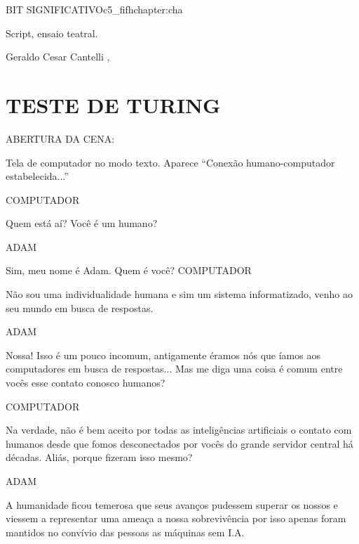 \begin{chapterpage}{BIT SIGNIFICATIVO}{c5_fifhchapter:cha}

\begin{myquotation} Script, ensaio teatral. 
\par\vspace*{15mm}
\mbox{}\hfill \emdash{}Geraldo Cesar Cantelli 
, %
\par\end{myquotation}

\end{chapterpage}



\section{TESTE DE TURING}\label{c1_basicformatting:sec}

ABERTURA DA CENA:

\emdash{}Tela de computador no modo texto. Aparece “Conexão
humano-computador estabelecida...”

COMPUTADOR

\emdash{}Quem está aí? Você é um humano?

ADAM

\emdash{}Sim, meu nome é Adam. Quem é você?
COMPUTADOR

\emdash{}Não sou uma individualidade humana e sim
um sistema informatizado, venho ao seu
mundo em busca de respostas.

ADAM

\emdash{}Nossa! Isso é um pouco incomum,
antigamente éramos nós que íamos aos
computadores em busca de respostas...
Mas me diga uma coisa é comum entre
vocês esse contato conosco humanos?

COMPUTADOR

\emdash{}Na verdade, não é bem aceito por todas
as inteligências artificiais o contato
com humanos desde que fomos
desconectados por vocês do grande
servidor central há décadas. Aliás,
porque fizeram isso mesmo?

ADAM

\emdash{}A humanidade ficou temerosa que seus
avanços pudessem superar os nossos e
viessem a representar uma ameaça a nossa
sobrevivência por isso apenas foram
mantidos no convívio das pessoas as
máquinas sem I.A.

